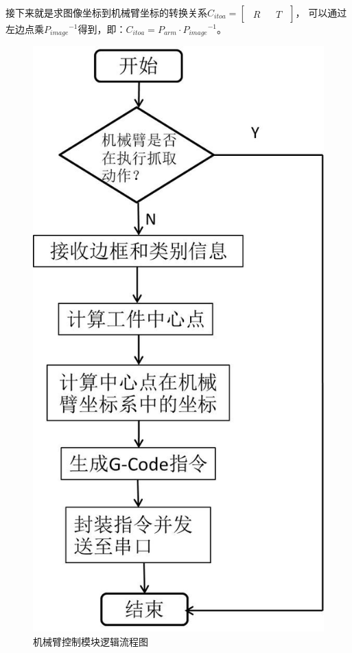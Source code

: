接下来就是求图像坐标到机械臂坐标的转换关系$C_{itoa} = \left [ \begin{array}{c|c} \begin{matrix} R \end{matrix}& \begin{matrix} T \end{matrix} \end{array} \right ]$，
可以通过左边点乘${P_{image}}^{-1}$得到，即：$C_{itoa} =  P_{arm} \cdot {P_{image}}^{-1}$。

\begin{figure}[h]
    \centering
    \includegraphics[scale=0.7]{pic/chap2/robot_control.jpg}
    \caption{机械臂控制模块逻辑流程图}
    \label{fig:robot:control}
\end{figure}

